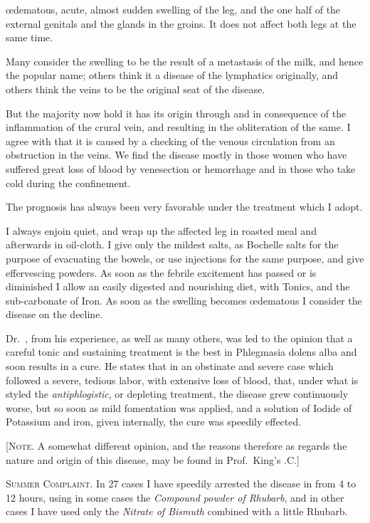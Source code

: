 œdematous, acute, almost sudden swelling of the leg, and the one half
of the external genitals and the glands in the groins. It does not
affect both legs at the same time.

Many consider the swelling to be the result of a metastasis of the
milk, and hence the popular name; others think it a disease of the
lymphatics originally, and others think the veins to be the original
seat of the disease.

But the majority now hold it has its origin through and in consequence
of the inflammation of the crural vein, and resulting in the
obliteration of the same. I agree with  that it is caused by a
checking of the venous circulation from an obstruction in the veins.
We find the disease mostly in those women who have suffered great
loss of blood by venesection or hemorrhage and in those who take cold
during the confinement.

The prognosis has always been very favorable under the treatment
which I adopt.

I always enjoin quiet, and wrap up the affected leg in roasted meal
and afterwards in oil-cloth. I give only the mildest salts, as Bochelle
salts for the purpose of evacuating the bowels, or use injections for
the same purpose, and give effervescing powders. As soon as the
febrile excitement has passed or is diminished I allow an easily digested
and nourishing diet, with Tonics, and the sub-carbonate of Iron. As
soon as the swelling becomes œdematous I consider the disease on the
decline.

Dr.~, from his experience, as well as many others, was led
to the opinion that a careful tonic and sustaining treatment is the best
in Phlegmasia dolens alba and soon results in a cure. He states that
in an obstinate and severe case which followed a severe, tedious labor,
with extensive loss of blood, that, under what is styled the \emph{antiphlogistic},
or depleting treatment, the disease grew continuously worse, but
so soon as mild fomentation was applied, and a solution of Iodide of
Potassium and iron, given internally, the cure was speedily effected.

[\textsc{Note}. A somewhat different opinion, and the reasons therefore as
regards the nature and origin of this disease, may be found in Prof.~King's
.\hfill{}C.\quad{}]

\textsc{Summer Complaint}. In 27 cases I have speedily arrested the disease
in from 4 to 12 hours, using in some cases the \emph{Compound powder
of Rhubarb}, and in other cases I have used only the \emph{Nitrate of Bismuth}
combined with a little Rhubarb.\endinput
